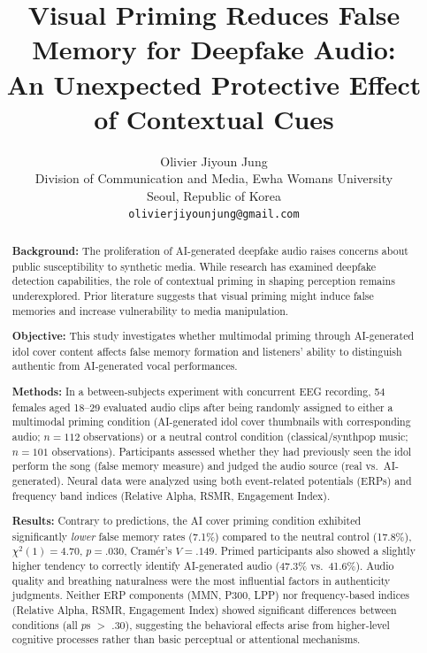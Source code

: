 \documentclass[12pt, a4paper]{article}
\title{%
    \Large\textbf{Visual Priming Reduces False Memory for Deepfake Audio: \\
    An Unexpected Protective Effect of Contextual Cues}
}
\author{
    Olivier Jiyoun Jung\\
    \small Division of Communication and Media, Ewha Womans University\\
    \small Seoul, Republic of Korea\\
    \small \texttt{olivierjiyounjung@gmail.com}
}
\date{}
\begin{document}
\maketitle


\begin{abstract}
\noindent
\textbf{Background:} The proliferation of AI-generated deepfake audio raises concerns about public susceptibility to synthetic media. While research has examined deepfake detection capabilities, the role of contextual priming in shaping perception remains underexplored. Prior literature suggests that visual priming might induce false memories and increase vulnerability to media manipulation.

\noindent
\textbf{Objective:} This study investigates whether multimodal priming through AI-generated idol cover content affects false memory formation and listeners' ability to distinguish authentic from AI-generated vocal performances.

\noindent
\textbf{Methods:} In a between-subjects experiment with concurrent EEG recording, 54 females aged 18--29 evaluated audio clips after being randomly assigned to either a multimodal priming condition (AI-generated idol cover thumbnails with corresponding audio; $n = 112$ observations) or a neutral control condition (classical/synthpop music; $n = 101$ observations). Participants assessed whether they had previously seen the idol perform the song (false memory measure) and judged the audio source (real vs.\ AI-generated). Neural data were analyzed using both event-related potentials (ERPs) and frequency band indices (Relative Alpha, RSMR, Engagement Index).

\noindent
\textbf{Results:} Contrary to predictions, the AI cover priming condition exhibited significantly \textit{lower} false memory rates (7.1\%) compared to the neutral control (17.8\%), $\chi^2(1) = 4.70$, $p = .030$, Cram\'{e}r's $V = .149$. Primed participants also showed a slightly higher tendency to correctly identify AI-generated audio (47.3\% vs.\ 41.6\%). Audio quality and breathing naturalness were the most influential factors in authenticity judgments. Neither ERP components (MMN, P300, LPP) nor frequency-based indices (Relative Alpha, RSMR, Engagement Index) showed significant differences between conditions (all $p$s $>$ .30), suggesting the behavioral effects arise from higher-level cognitive processes rather than basic perceptual or attentional mechanisms.


\end{abstract}
\end{document}
